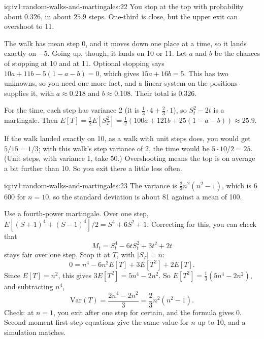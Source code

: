 \begin{solution}{iq:iv1:random-walks-and-martingales:22}
You stop at the top with probability about $0.326$, in about $25.9$ steps. One-third is close, but the upper exit can overshoot to 11.

The walk has mean step 0, and it moves down one place at a time, so it lands exactly on $-5$. Going up, though, it lands on 10 or 11. Let $a$ and $b$ be the chances of stopping at 10 and at 11. Optional stopping says $10a + 11b - 5(1 - a - b) = 0$, which gives $15a + 16b = 5$. This has two unknowns, so you need one more fact, and a linear system on the positions supplies it, with $a \approx 0.218$ and $b \approx 0.108$. Their total is $0.326$.

For the time, each step has variance 2 (it is $\tfrac13 \cdot 4 + \tfrac23 \cdot 1$), so $S_t^2 - 2t$ is a martingale. Then $E[T] = \tfrac12 E[S_T^2] = \tfrac12(100a + 121b + 25(1 - a - b)) \approx 25.9$.

If the walk landed exactly on 10, as a walk with unit steps does, you would get $5/15 = 1/3$; with this walk's step variance of 2, the time would be $5 \cdot 10/2 = 25$. (Unit steps, with variance 1, take 50.) Overshooting means the top is on average a bit further than 10. So you exit there a little less often.

\end{solution}

\enlargethispage{-1\baselineskip}%
\begin{solution}{iq:iv1:random-walks-and-martingales:23}
The variance is $\tfrac23 n^2(n^2 - 1)$, which is 6\,600 for $n = 10$, so the standard deviation is about 81 against a mean of 100.

Use a fourth-power martingale. Over one step, $E[(S + 1)^4 + (S - 1)^4]/2 = S^4 + 6S^2 + 1$. Correcting for this, you can check that
\[
M_t = S_t^4 - 6tS_t^2 + 3t^2 + 2t
\]
stays fair over one step. Stop it at $T$, with $|S_T| = n$:
\[
0 = n^4 - 6n^2 E[T] + 3E[T^2] + 2E[T].
\]
Since $E[T] = n^2$, this gives $3E[T^2] = 5n^4 - 2n^2$. So $E[T^2] = \tfrac13(5n^4 - 2n^2)$, and subtracting $n^4$,
\[
\mathrm{Var}(T) = \frac{2n^4 - 2n^2}{3} = \frac23 n^2(n^2 - 1).
\]
Check: at $n = 1$, you exit after one step for certain, and the formula gives 0. Second-moment first-step equations give the same value for $n$ up to 10, and a simulation matches.

\end{solution}


